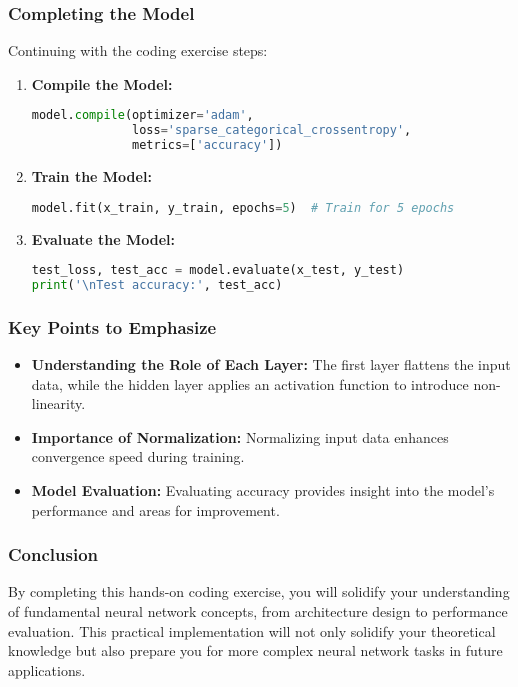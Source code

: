 \documentclass[aspectratio=169]{beamer}
\begin{document}
\begin{frame}[fragile]
    \frametitle{Completing the Model}
    Continuing with the coding exercise steps:

    \begin{enumerate}[start=5]
        \item \textbf{Compile the Model:}
        \begin{lstlisting}[language=python]
model.compile(optimizer='adam',
              loss='sparse_categorical_crossentropy',
              metrics=['accuracy'])
        \end{lstlisting}

        \item \textbf{Train the Model:}
        \begin{lstlisting}[language=python]
model.fit(x_train, y_train, epochs=5)  # Train for 5 epochs
        \end{lstlisting}

        \item \textbf{Evaluate the Model:}
        \begin{lstlisting}[language=python]
test_loss, test_acc = model.evaluate(x_test, y_test)
print('\nTest accuracy:', test_acc)
        \end{lstlisting}
    \end{enumerate}
\end{frame}

\begin{frame}
    \frametitle{Key Points to Emphasize}
    \begin{itemize}
        \item \textbf{Understanding the Role of Each Layer:} The first layer flattens the input data, while the hidden layer applies an activation function to introduce non-linearity.
        \item \textbf{Importance of Normalization:} Normalizing input data enhances convergence speed during training.
        \item \textbf{Model Evaluation:} Evaluating accuracy provides insight into the model's performance and areas for improvement.
    \end{itemize}
\end{frame}

\begin{frame}
    \frametitle{Conclusion}
    By completing this hands-on coding exercise, you will solidify your understanding of fundamental neural network concepts, from architecture design to performance evaluation. 
    This practical implementation will not only solidify your theoretical knowledge but also prepare you for more complex neural network tasks in future applications.
\end{frame}
\end{document}
